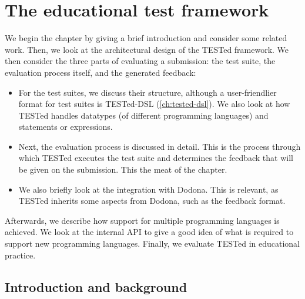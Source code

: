 \documentclass[../main]{subfiles}
\begin{document}
\chapter{The \tested{} educational test framework}\label{ch:tested1}

We begin the chapter by giving a brief introduction and consider some related work.
Then, we look at the architectural design of the TESTed framework.
We then consider the three parts of evaluating a submission:
the test suite, the evaluation process itself, and the generated feedback:

\begin{itemize}
    \item For the test suites, we discuss their structure, although a user-friendlier format for test suites is TESTed-DSL (\vref{ch:tested-dsl}).
          We also look at how TESTed handles datatypes (of different programming languages) and statements or expressions.
    \item Next, the evaluation process is discussed in detail.
          This is the process through which TESTed executes the test suite and determines the feedback that will be given on the submission.
          This the meat of the chapter.
    \item We also briefly look at the integration with Dodona.
          This is relevant, as TESTed inherits some aspects from Dodona, such as the feedback format.
\end{itemize}

Afterwards, we describe how support for multiple programming languages is achieved.
We look at the internal API to give a good idea of what is required to support new programming languages.
Finally, we evaluate TESTed in educational practice.

\section{Introduction and background}\label{sec:tested1-introduction-and-background}
\end{document}
